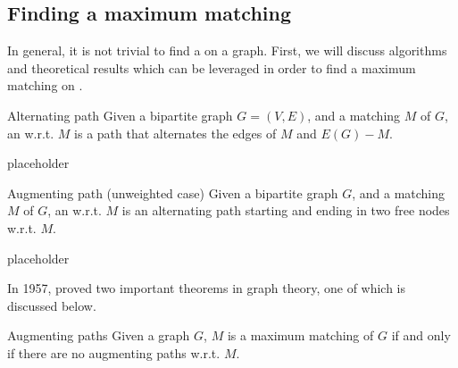 \documentclass[a4paper, 12pt]{report}
\begin{document}
    \subsection{Finding a maximum matching}

    In general, it is not trivial to find a  on a graph. First, we will discuss algorithms and theoretical results which can be leveraged in order to find a maximum matching on .

    \begin{frameddefn}{Alternating path}
        Given a bipartite graph $G = (V, E)$, and a matching $M$ of $G$, an  w.r.t. $M$ is a path that alternates the edges of $M$ and $E(G) - M$.
    \end{frameddefn}

    \begin{example}
        placeholder 
    \end{example}

    \begin{frameddefn}[label={aug path}]{Augmenting path (unweighted case)}
        Given a bipartite graph $G$, and a matching $M$ of $G$, an  w.r.t. $M$ is an alternating path starting and ending in two free nodes w.r.t. $M$.
    \end{frameddefn}

    \begin{example}
        placeholder 
    \end{example}

    In 1957, \textcite{berge} proved two important theorems in graph theory, one of which is discussed below.

    \begin{framedthm}[label={aug paths}]{Augmenting paths}
        Given a graph $G$, $M$ is a maximum matching of $G$ if and only if there are no augmenting paths w.r.t. $M$.
    \end{framedthm}
\end{document}
